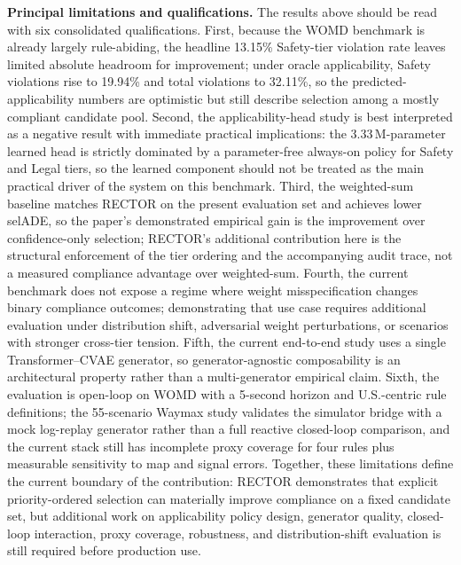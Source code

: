 \textbf{Principal limitations and qualifications.}
The results above should be read with six consolidated qualifications.  First, because the WOMD benchmark is already largely rule-abiding, the headline 13.15\% Safety-tier violation rate leaves limited absolute headroom for improvement; under oracle applicability, Safety violations rise to 19.94\% and total violations to 32.11\%, so the predicted-applicability numbers are optimistic but still describe selection among a mostly compliant candidate pool.  Second, the applicability-head study is best interpreted as a negative result with immediate practical implications: the 3.33\,M-parameter learned head is strictly dominated by a parameter-free always-on policy for Safety and Legal tiers, so the learned component should not be treated as the main practical driver of the system on this benchmark.  Third, the weighted-sum baseline matches RECTOR on the present evaluation set and achieves lower selADE, so the paper's demonstrated empirical gain is the improvement over confidence-only selection; RECTOR's additional contribution here is the structural enforcement of the tier ordering and the accompanying audit trace, not a measured compliance advantage over weighted-sum.  Fourth, the current benchmark does not expose a regime where weight misspecification changes binary compliance outcomes; demonstrating that use case requires additional evaluation under distribution shift, adversarial weight perturbations, or scenarios with stronger cross-tier tension.  Fifth, the current end-to-end study uses a single Transformer--CVAE generator, so generator-agnostic composability is an architectural property rather than a multi-generator empirical claim.  Sixth, the evaluation is open-loop on WOMD with a 5-second horizon and U.S.-centric rule definitions; the 55-scenario Waymax study validates the simulator bridge with a mock log-replay generator rather than a full reactive closed-loop comparison, and the current stack still has incomplete proxy coverage for four rules plus measurable sensitivity to map and signal errors.  Together, these limitations define the current boundary of the contribution: RECTOR demonstrates that explicit priority-ordered selection can materially improve compliance on a fixed candidate set, but additional work on applicability policy design, generator quality, closed-loop interaction, proxy coverage, robustness, and distribution-shift evaluation is still required before production use.
